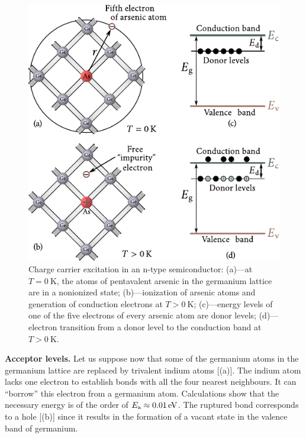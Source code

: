 \begin{figure}[t]
	\begin{center}
		\includegraphics[scale=1]{figures/ch_05/fig_5_15.pdf}
		\caption[]{Charge carrier excitation in an n-type semiconductor: (a)---at $T=\SI{0}{\kelvin}$, the atoms of pentavalent arsenic in the germanium lattice are in a nonionized state; (b)---ionization of arsenic atoms and generation of conduction electrons at $T>\SI{0}{\kelvin}$; (c)---energy levels of one of the five electrons of every arsenic atom are donor levels; (d)---electron transition from a donor level to the conduction band at $T>\SI{0}{\kelvin}$.}
		\label{fig:5_15}
	\end{center}
	\vspace{-0.7cm}
\end{figure}

\textbf{Acceptor levels.} Let us suppose now that some of the germanium atoms in the germanium lattice are replaced by trivalent indium atoms [(a)]. The indium atom lacks one electron to establish bonds with all the four nearest neighbours. It can ``borrow'' this electron from a germanium atom. Calculations show that the necessary energy is of the order of $E_{\text{a}}\approx\SI{0.01}{\electronvolt}$. The ruptured bond corresponds to a hole [(b)] since it results in the formation of a vacant state in the valence band of germanium.

